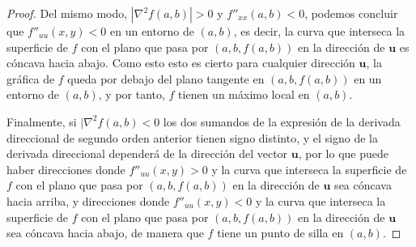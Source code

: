 \documentclass[
  a4paper,
]{scrreport}
\theoremstyle{definition}
\theoremstyle{plain}
\theoremstyle{plain}
\theoremstyle{definition}
\theoremstyle{definition}
\theoremstyle{plain}
\theoremstyle{remark}
\begin{document}
\begin{tcolorbox}
\begin{proof}
Del mismo modo, \(|\nabla ^2f(a,b)|>0\) y \(f''_{xx}(a,b)<0\), podemos
concluir que \(f''_{uu}(x,y)<0\) en un entorno de \((a,b)\), es decir,
la curva que interseca la superficie de \(f\) con el plano que pasa por
\((a,b,f(a,b))\) en la dirección de \(\mathbf{u}\) es cóncava hacia
abajo. Como esto esto es cierto para cualquier dirección \(\mathbf{u}\),
la gráfica de \(f\) queda por debajo del plano tangente en
\((a,b,f(a,b))\) en un entorno de \((a,b)\), y por tanto, \(f\) tienen
un máximo local en \((a,b)\).

Finalmente, si \(|\nabla ^2f(a,b)<0\) los dos sumandos de la expresión
de la derivada direccional de segundo orden anterior tienen signo
distinto, y el signo de la derivada direccional dependerá de la
dirección del vector \(\mathbf{u}\), por lo que puede haber direcciones
donde \(f''_{uu}(x,y)>0\) y la curva que interseca la superficie de
\(f\) con el plano que pasa por \((a,b,f(a,b))\) en la dirección de
\(\mathbf{u}\) sea cóncava hacia arriba, y direcciones donde
\(f''_{uu}(x,y)<0\) y la curva que interseca la superficie de \(f\) con
el plano que pasa por \((a,b,f(a,b))\) en la dirección de \(\mathbf{u}\)
sea cóncava hacia abajo, de manera que \(f\) tiene un punto de silla en
\((a,b)\).

\end{proof}

\end{tcolorbox}
\end{document}
